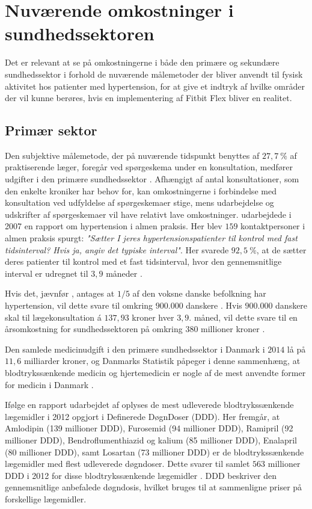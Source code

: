 \section{Nuværende omkostninger i sundhedssektoren}
Det er relevant at se på omkostningerne i både den primære og sekundære sundhedssektor i forhold de nuværende målemetoder der bliver anvendt til fysisk aktivitet hos patienter med hypertension, for at give et indtryk af hvilke områder der vil kunne berøres, hvis en implementering af Fitbit Flex bliver en realitet. 

\subsection{Primær sektor} \label{sec:nuv_primaer}
\label{sec:primaer_sektor_omkostninger}
Den subjektive målemetode, der på nuværende tidspunkt benyttes af $27,7~\%$ af praktiserende læger, foregår ved spørgeskema under en konsultation, medfører udgifter i den primære sundhedssektor \citep{munck2007}. Afhængigt af antal konsultationer, som den enkelte kroniker har behov for, kan omkostningerne i forbindelse med konsultation ved udfyldelse af spørgeskemaer stige, mens udarbejdelse og udskrifter af spørgeskemaer vil have relativt lave omkostninger.
\citeauthor{munck2007} udarbejdede i 2007 en rapport om hypertension i almen praksis. Her blev $159$ kontaktpersoner i almen praksis spurgt: \textit{"Sætter I jeres hypertensionspatienter til kontrol med fast tidsinterval? Hvis ja, angiv det typiske interval"}. Her svarede $92,5~\%$, at de sætter deres patienter til kontrol med et fast tidsinterval, hvor den gennemsnitlige interval er udregnet til $3,9$ måneder \citep{munck2007}. 

Hvis det, jævnfør \citeauthor{kronborg2008}, antages at $1/5$ af den voksne danske befolkning har hypertension, vil dette svare til omkring $900.000$ danskere \citep{folketal2016}. Hvis $900.000$ danskere skal til lægekonsultation á $137,93$ kroner hver $3,9$. måned, vil dette svare til en årsomkostning for sundhedssektoren på omkring $380$ millioner kroner \citep{honorartabel2016}. 

Den samlede medicinudgift i den primære sundhedssektor i Danmark i $2014$ lå på $11,6$ milliarder kroner, og Danmarks Statistik påpeger i denne sammenhæng, at blodtrykssænkende medicin og hjertemedicin er nogle af de mest anvendte former for medicin i Danmark \citep{dst2016}. 

Ifølge en rapport udarbejdet af \citeauthor{apotekerforeningen2012} oplyses de mest udleverede blodtrykssænkende lægemidler i 2012 opgjort i Definerede DøgnDoser (DDD). Her fremgår, at Amlodipin (139 millioner DDD), Furosemid (94 millioner DDD), Ramipril (92 millioner DDD), Bendroflumenthiazid og kalium (85 millioner DDD), Enalapril (80 millioner DDD), samt Losartan (73 millioner DDD) er de blodtrykssænkende lægemidler med flest udleverede døgndoser. Dette svarer til samlet $563$ millioner DDD i 2012 for disse blodtrykssænkende lægemidler \citep{apotekerforeningen2012}. DDD beskriver den gennemsnitlige anbefalede døgndosis, hvilket bruges til at sammenligne priser på forskellige lægemidler. 

